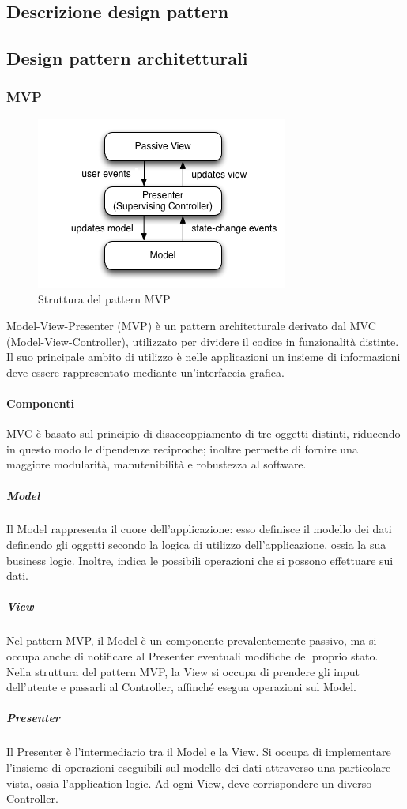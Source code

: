 \documentclass[../SpecificaTecnica.tex]{subfiles}
\begin{document}
\begin{appendices}

\section{Descrizione design pattern}
	\subsection{Design pattern architetturali}
		\subsubsection{MVP}
		
		\begin{figure}[!h]
		\centering
		\includegraphics[scale=0.6]{pattern/mvp}
			\caption{Struttura del pattern MVP}
		\label{fig:Struttura_MVP}
	\end{figure}
	
			Model-View-Presenter (MVP) è un pattern architetturale derivato dal MVC (Model-View-Controller), utilizzato per dividere il codice in funzionalità distinte. Il suo principale ambito di utilizzo è nelle applicazioni un insieme di informazioni deve essere rappresentato mediante un'interfaccia grafica.
			\paragraph{Componenti}
			MVC è basato sul principio di disaccoppiamento di tre oggetti distinti, riducendo in questo modo le dipendenze reciproche; inoltre permette di fornire una maggiore modularità, manutenibilità e robustezza al software.
				\subparagraph{Model}
					Il Model rappresenta il cuore dell'applicazione: esso definisce il modello dei dati definendo gli oggetti secondo la logica di utilizzo dell'applicazione, ossia la sua business logic. Inoltre, indica le possibili operazioni che si possono effettuare sui dati.
				\subparagraph{View}
					Nel pattern MVP, il Model è un componente prevalentemente passivo, ma si occupa anche di notificare al Presenter eventuali modifiche del proprio stato. Nella struttura del pattern MVP, la View si occupa di prendere gli input dell'utente e passarli al Controller, affinché esegua operazioni sul Model.
				\subparagraph{Presenter}
					Il Presenter è l'intermediario tra il Model e la View. Si occupa di implementare l'insieme di operazioni eseguibili sul modello dei dati attraverso una particolare vista, ossia l'application logic. Ad ogni View, deve corrispondere un diverso Controller.

\end{appendices}
\end{document}
